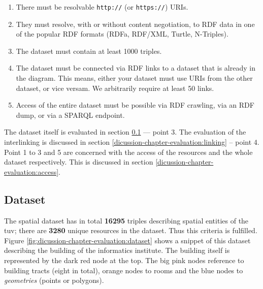 \documentclass[draft,final]{vutinfth} %
\begin{document}
\begin{enumerate}
	\item There must be resolvable \texttt{http://} (or \texttt{https://}) URIs.
	\item They must resolve, with or without content negotiation, to RDF data in one of the popular RDF formats (RDFa, RDF/XML, Turtle, N-Triples).
	\item The dataset must contain at least 1000 triples.
	\item The dataset must be connected via RDF links to a dataset that is already in the diagram. This means, either your dataset must use URIs from the other dataset, or vice versam. We arbitrarily require at least 50 links.
	\item Access of the entire dataset must be possible via RDF crawling, via an RDF dump, or via a SPARQL endpoint.
\end{enumerate}

The dataset itself is evaluated in section \ref{dicussion-chapter-evaluation:dataset} --- point 3. The evaluation of the interlinking is discussed in section \ref{dicussion-chapter-evaluation:linking} -- point 4.  Point 1 to 3 and 5 are concerned with the access of the resources and the whole dataset respectively. This is discussed in section \ref{dicussion-chapter-evaluation:access}.

\subsection{Dataset}
\label{dicussion-chapter-evaluation:dataset}
The spatial dataset has in total \textbf{16295} triples describing spatial entities of the \gls{tuv}; there are \textbf{3280} unique resources in the dataset. Thus this criteria is fulfilled. Figure \ref{fig:dicussion-chapter-evaluation:dataset} shows a snippet of this dataset describing the building of the informatics institute. The building itself is represented by the dark red node at the top. The big pink nodes reference to building tracts (eight in total), orange nodes to rooms and the blue nodes to \textit{geometries} (points or polygons). 
\end{document}
